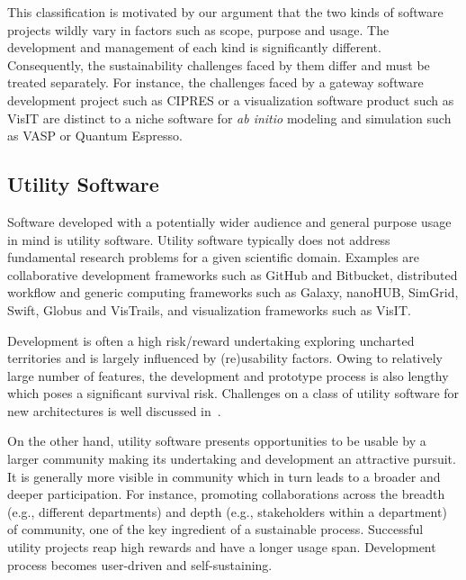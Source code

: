 \documentclass[11pt, oneside]{amsart}
\newcommand{\toolname}[1] {\textsf{#1}}
\begin{document}
This classification is motivated by our argument that the two kinds of software
projects wildly vary in factors such as scope, purpose and usage. The
development and management of each kind is significantly different.
Consequently, the sustainability challenges faced by them differ and must be
treated separately. For instance, the challenges faced by a gateway software
development project such as \toolname{CIPRES} or a visualization software product
such as \toolname{VisIT} are distinct to a niche software for \textit{ab initio}
modeling and simulation such as \toolname{VASP} or \toolname{Quantum Espresso}.

\subsection{Utility Software}
Software developed with a potentially wider audience and general purpose usage
in mind is utility software. Utility software typically does not address
fundamental research problems for a given scientific domain. Examples are
collaborative development frameworks such as \toolname{GitHub} and
\toolname{Bitbucket}, distributed workflow and generic computing frameworks
such as \toolname{Galaxy}, \toolname{nanoHUB}, \toolname{SimGrid}, \toolname{Swift},
\toolname{Globus} and \toolname{VisTrails}, and visualization frameworks such as
\toolname{VisIT}.

Development is often a high risk/reward undertaking exploring uncharted
territories and is largely influenced by (re)usability factors. Owing to
relatively large number of features, the development and prototype process is
also lengthy which poses a significant survival risk. Challenges on a class of
utility software for new architectures is well discussed
in~\cite{Ferenbaugh_WSSSPE}.

On the other hand, utility software presents opportunities to be usable by a
larger community making its undertaking and development an attractive pursuit.
It is generally more visible in community which in turn leads to a broader and
deeper participation. For instance, promoting collaborations across the breadth
(e.g., different departments) and depth (e.g., stakeholders within a department)
of community, one of the key ingredient of a sustainable process. Successful
utility projects reap high rewards and have a longer usage span. Development
process becomes user-driven and self-sustaining.
\end{document}
